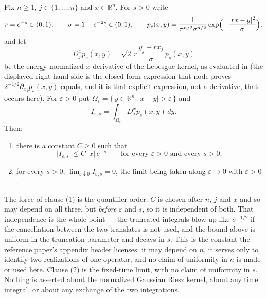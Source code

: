 \begin{lemma}
Fix $n \geq 1$, $j \in \{1,\ldots,n\}$ and $x \in \mathbb{R}^n$.  For $s > 0$
write
\[
  r = e^{-s} \in (0,1), \qquad \sigma = 1 - e^{-2s} \in (0,1),
  \qquad
  p_s(x,y) = \frac{1}{\pi^{n/2}\sigma^{n/2}}
      \exp\Bigl(-\frac{|rx-y|^2}{\sigma}\Bigr) ,
\]
and let
\[
  D_j^x p_s(x,y) = \sqrt2\,r\,\frac{y_j - r x_j}{\sigma}\,p_s(x,y)
\]
be the energy-normalized $x$-derivative of the Lebesgue kernel, as evaluated in
 (the displayed right-hand side is the
closed-form expression that node proves $2^{-1/2}\partial_{x_j}p_s(x,y)$ equals,
and it is that explicit expression, not a derivative, that occurs here).  For
$\varepsilon > 0$ put
$\Omega_\varepsilon = \{\,y \in \mathbb{R}^n : |x-y| > \varepsilon\,\}$ and
\[
  I_{\varepsilon,s} = \int_{\Omega_\varepsilon} D_j^xp_s(x,y)\,dy .
\]
Then:
\begin{enumerate}
\item there is a constant $C \geq 0$ such that
\[
  \bigl|I_{\varepsilon,s}\bigr| \leq C\,|x|\,e^{-s}
  \qquad\text{for every } \varepsilon > 0 \text{ and every } s > 0 ;
\]
\item for every $s > 0$,
$\displaystyle\lim_{\varepsilon\downarrow0} I_{\varepsilon,s} = 0$, the limit
being taken along $\varepsilon \to 0$ with $\varepsilon > 0$.
\end{enumerate}

The force of clause (1) is the quantifier order: $C$ is chosen after $n$, $j$
and $x$ and so may depend on all three, but \emph{before} $\varepsilon$ and $s$,
so it is independent of both.  That independence is the whole point --- the
truncated integrals blow up like $\sigma^{-1/2}$ if the cancellation between the
two translates is not used, and the bound above is uniform in the truncation
parameter and decays in $s$.  This is the constant the reference paper's
appendix header licenses: it may depend on $n$, it serves only to identify two
realizations of one operator, and no claim of uniformity in $n$ is made or used
here.  Clause (2) is the fixed-time limit, with no claim of uniformity in $s$.
Nothing is asserted about the normalized Gaussian Riesz kernel, about any time
integral, or about any exchange of the two integrations.
\end{lemma}
